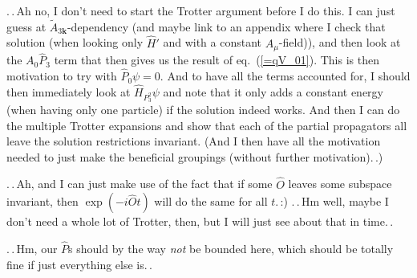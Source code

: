 \documentclass{report}
\begin{document}
.\,.\,Ah no, I don't need to start the Trotter argument before I do this. I can just guess at $\tilde A_{3\boldsymbol{k}}$-dependency (and maybe link to an appendix where I check that solution (when looking only $\hat H'$ and with a constant $A_\mu$-field)), and then look at the $A_0\hat P_3$ term that then gives us the result of eq.\ (\ref{=qV_01}). This is then motivation to try with $\hat P_0 \psi = 0$. And to have all the terms accounted for, I should then immediately look at $\hat H_{P_3^2}\psi$ and note that it only adds a constant energy (when having only one particle) if the solution indeed works. And then I can do the multiple Trotter expansions and show that each of the partial propagators all leave the solution restrictions invariant. (And I then have all the motivation needed to just make the beneficial groupings (without further motivation).\,.) %

.\,.\,Ah, and I can just make use of the fact that if some $\hat O$ leaves some subspace invariant, then $\exp(-i\hat O t)$ will do the same for all $t$.\,:) .\,.\,Hm well, maybe I don't need a whole lot of Trotter, then, but I will just see about that in time.\,.

.\,.\,Hm, our $\hat P$s should by the way \emph{not} be bounded here, which should be totally fine if just everything else is.\,. 
\end{document}
